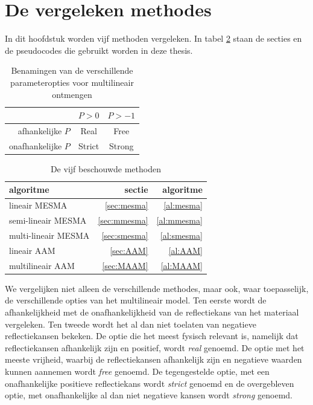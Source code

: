 \documentclass[12pt]{report}
\begin{document}
\section{De vergeleken methodes}

In dit hoofdstuk worden vijf methoden vergeleken. In tabel \ref{tab:a} staan de secties en de pseudocodes die gebruikt worden  in deze thesis.  

\begin{table}
\Large\center
\begin{tabular}{r|c c}
&$P>0$&$P>-1$ \\
\hline
afhankelijke $P$ & Real & Free \\
onafhankelijke $P$ & Strict & Strong
\end{tabular}
\caption{Benamingen van de verschillende parameteropties voor multilineair ontmengen \label{tab:b}}
\end{table}


\begin{table}
\begin{tabular}{l r r}
algoritme & sectie & algoritme \\
\hline
lineair MESMA & \ref{sec:mesma} & \ref{al:mesma}\\
semi-lineair MESMA & \ref{sec:mmesma} &\ref{al:mmesma}\\
multi-lineair MESMA & \ref{sec:smesma} &\ref{al:smesma}\\
lineair AAM & \ref{sec:AAM}&\ref{al:AAM} \\
multilineair AAM & \ref{sec:MAAM} & \ref{al:MAAM} 
\end{tabular}
\caption{De vijf beschouwde methoden \label{tab:a}}
\end{table}


We vergelijken niet alleen de verschillende methodes, maar ook, waar toepasselijk, de verschillende opties van het multilineair model. Ten eerste wordt de afhankelijkheid met de onafhankelijkheid van de reflectiekans van het materiaal vergeleken. Ten tweede wordt het al dan niet toelaten van negatieve reflectiekansen bekeken. De optie die het meest fysisch relevant is, namelijk dat reflectiekansen afhankelijk zijn en positief, wordt \textit{real} genoemd. De optie met het meeste vrijheid, waarbij de reflectiekansen afhankelijk zijn en negatieve waarden kunnen aannemen wordt \textit{free} genoemd. De tegengestelde optie, met een onafhankelijke positieve reflectiekans wordt \textit{strict} genoemd en de overgebleven optie, met onafhankelijke al dan niet negatieve kansen wordt \textit{strong} genoemd. 
\end{document}
